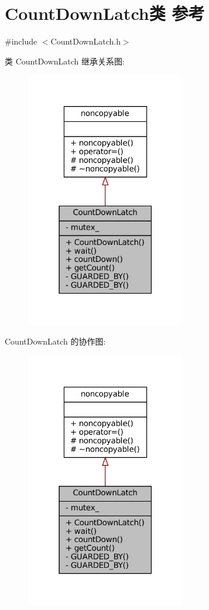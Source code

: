 \hypertarget{classmuduo_1_1CountDownLatch}{}\section{Count\+Down\+Latch类 参考}
\label{classmuduo_1_1CountDownLatch}


{\ttfamily \#include $<$Count\+Down\+Latch.\+h$>$}



类 Count\+Down\+Latch 继承关系图\+:
\nopagebreak
\begin{figure}[H]
\begin{center}
\leavevmode
\includegraphics[width=198pt]{classmuduo_1_1CountDownLatch__inherit__graph}
\end{center}
\end{figure}


Count\+Down\+Latch 的协作图\+:
\nopagebreak
\begin{figure}[H]
\begin{center}
\leavevmode
\includegraphics[width=198pt]{classmuduo_1_1CountDownLatch__coll__graph}
\end{center}
\end{figure}
